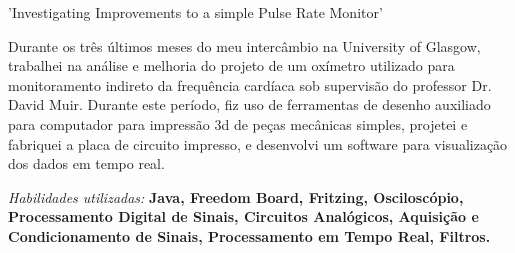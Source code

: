 \documentclass[a4paper]{twentysecondcv} %
\begin{document}
\begin{twenty}
{'Investigating Improvements to a simple Pulse Rate Monitor'}
{}
{\hspace{8pt}Durante os três últimos meses do meu intercâmbio na University of 
Glasgow, trabalhei na análise e melhoria do projeto de um oxímetro utilizado para
monitoramento indireto da frequência cardíaca sob supervisão do professor Dr. 
David Muir. Durante este período, fiz uso de ferramentas de desenho auxiliado para
computador para impressão 3d de peças mecânicas simples, projetei e fabriquei a 
placa de circuito impresso, e desenvolvi um software para visualização dos dados 
em tempo real.

\hspace{8pt}\textit{Habilidades utilizadas:} \textbf{Java, Freedom Board, 
Fritzing, Osciloscópio, Processamento Digital de Sinais, Circuitos Analógicos, 
Aquisição e Condicionamento de Sinais, Processamento em Tempo Real, Filtros.}}
\end{twenty}
\end{document}
